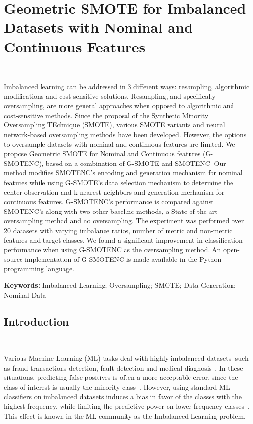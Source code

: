 \chapter{%
    Geometric SMOTE for Imbalanced Datasets with Nominal and Continuous Features
}~\label{chp:gsmotenc}
\graphicspath{{figures/gsmotenc/}}

\begin{adjustwidth}{30pt}{30pt}

    Imbalanced learning can be addressed in 3 different ways: resampling,
    algorithmic modifications and cost-sensitive solutions. Resampling, and
    specifically oversampling, are more general approaches when opposed to
    algorithmic and cost-sensitive methods. Since the proposal of the
    Synthetic Minority Oversampling TEchnique (SMOTE), various SMOTE variants
    and neural network-based oversampling methods have been developed.
    However, the options to oversample datasets with nominal and continuous
    features are limited. We propose Geometric SMOTE for Nominal and
    Continuous features (G-SMOTENC), based on a combination of G-SMOTE and
    SMOTENC. Our method modifies SMOTENC's encoding and generation mechanism
    for nominal features while using G-SMOTE's data selection mechanism to
    determine the center observation and k-nearest neighbors and generation
    mechanism for continuous features. G-SMOTENC's performance is compared
    against SMOTENC's along with two other baseline methods, a
    State-of-the-art oversampling method and no oversampling. The experiment
    was performed over 20 datasets with varying imbalance ratios, number of
    metric and non-metric features and target classes. We found a significant
    improvement in classification performance when using G-SMOTENC as
    the oversampling method. An open-source implementation of G-SMOTENC is
    made available in the Python programming language.

\end{adjustwidth}

\vspace{.5cm}
\textbf{Keywords:} Imbalanced Learning; Oversampling; SMOTE; Data Generation;
Nominal Data

\section{Introduction}~\label{sec:introduction-gsmotenc}

Various Machine Learning (ML) tasks deal with highly imbalanced datasets, such
as fraud transactions detection, fault detection and medical
diagnosis~\cite{tyagi2020sampling}. In these situations, predicting false
positives is often a more acceptable error, since the class of interest is
usually the minority class~\cite{vuttipittayamongkol2021class}. However, using
standard ML classifiers on imbalanced datasets induces a bias in favor of the
classes with the highest frequency, while limiting the predictive power on
lower frequency classes~\cite{lopez2013insight, das2018handling}. This effect
is known in the ML community as the Imbalanced Learning problem.

